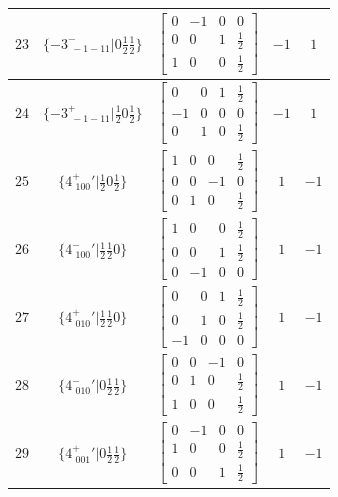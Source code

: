 \documentclass[fleqn,8pt]{jsarticle}
\begin{document}
\begin{longtable}{ccccc}
$ 23 $ & $ \{-3^{-}_{\,\,-1-11}|0 \frac{1}{2} \frac{1}{2}\} $ & $ \begin{bmatrix} 0 & -1 & 0 & 0 \\ 0 & 0 & 1 & \frac{1}{2} \\ 1 & 0 & 0 & \frac{1}{2} \end{bmatrix} $ & $ -1 $ & $ 1 $ \\ \hline
$ 24 $ & $ \{-3^{+}_{\,\,-1-11}|\frac{1}{2} 0 \frac{1}{2}\} $ & $ \begin{bmatrix} 0 & 0 & 1 & \frac{1}{2} \\ -1 & 0 & 0 & 0 \\ 0 & 1 & 0 & \frac{1}{2} \end{bmatrix} $ & $ -1 $ & $ 1 $ \\ \hline
$ 25 $ & $ \{4^{+}_{\,\,100}{}'|\frac{1}{2} 0 \frac{1}{2}\} $ & $ \begin{bmatrix} 1 & 0 & 0 & \frac{1}{2} \\ 0 & 0 & -1 & 0 \\ 0 & 1 & 0 & \frac{1}{2} \end{bmatrix} $ & $ 1 $ & $ -1 $ \\ \hline
$ 26 $ & $ \{4^{-}_{\,\,100}{}'|\frac{1}{2} \frac{1}{2} 0\} $ & $ \begin{bmatrix} 1 & 0 & 0 & \frac{1}{2} \\ 0 & 0 & 1 & \frac{1}{2} \\ 0 & -1 & 0 & 0 \end{bmatrix} $ & $ 1 $ & $ -1 $ \\ \hline
$ 27 $ & $ \{4^{+}_{\,\,010}{}'|\frac{1}{2} \frac{1}{2} 0\} $ & $ \begin{bmatrix} 0 & 0 & 1 & \frac{1}{2} \\ 0 & 1 & 0 & \frac{1}{2} \\ -1 & 0 & 0 & 0 \end{bmatrix} $ & $ 1 $ & $ -1 $ \\ \hline
$ 28 $ & $ \{4^{-}_{\,\,010}{}'|0 \frac{1}{2} \frac{1}{2}\} $ & $ \begin{bmatrix} 0 & 0 & -1 & 0 \\ 0 & 1 & 0 & \frac{1}{2} \\ 1 & 0 & 0 & \frac{1}{2} \end{bmatrix} $ & $ 1 $ & $ -1 $ \\ \hline
$ 29 $ & $ \{4^{+}_{\,\,001}{}'|0 \frac{1}{2} \frac{1}{2}\} $ & $ \begin{bmatrix} 0 & -1 & 0 & 0 \\ 1 & 0 & 0 & \frac{1}{2} \\ 0 & 0 & 1 & \frac{1}{2} \end{bmatrix} $ & $ 1 $ & $ -1 $ \\ \hline

\end{longtable}
\end{document}
